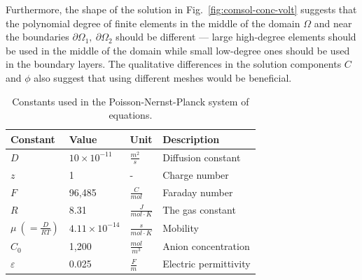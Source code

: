 Furthermore, the shape of the solution in Fig.~\ref{fig:comsol-conc-volt}
suggests that the polynomial degree of finite elements in the middle
of the domain $\Omega$ and near the boundaries $\partial \Omega_1,\ \partial \Omega_2$
should be different --- large high-degree elements should be used in the middle of the 
domain while small low-degree ones should be used in the boundary layers.  
The qualitative differences in the solution components $C$ and $\phi$ 
also suggest that using different meshes would be beneficial. 


\begin{table}
\caption{Constants used in the Poisson-Nernst-Planck system of equations.}
\centering
\label{Table:used-constants}
{
\begin{tabular}{llll}
  \hline \hline
  Constant&Value&Unit&Description\\
  \hline
  $D$&$10\times10^{-11}$&$\frac{m^2}{s}$&Diffusion constant\\
  $z$&1&-&Charge number\\
  $F$&96,485&$\frac{C}{mol}$&Faraday number\\
  $R$&8.31&$\frac{J}{mol\cdot K}$&The gas constant\\
  $\mu\ \left( = \frac{D}{RT}\right)$&$4.11\times 10^{-14}$&$\frac{s}{mol\cdot K}$&Mobility\\
  $C_{0}$&1,200&$\frac{mol}{m^3}$&Anion concentration\\
  $\varepsilon$&0.025&$\frac{F}{m}$&Electric permittivity\\
  \hline
  \hline
\end{tabular}
}
\end{table}

